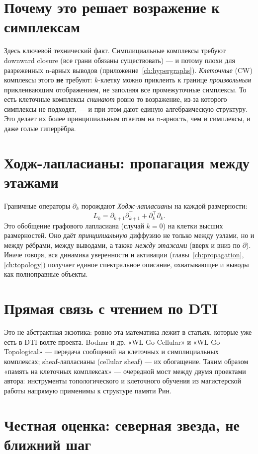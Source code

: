 \section{Почему это решает возражение к симплексам}

Здесь ключевой технический факт. Симплициальные комплексы требуют downward closure
(все грани обязаны существовать) — и потому плохи для разреженных n-арных выводов
(приложение~\ref{ch:hypergraphs}). \emph{Клеточные} (CW) комплексы этого
\textbf{не} требуют: $k$-клетку можно приклеить к границе \emph{произвольным}
приклеивающим отображением, не заполняя все промежуточные симплексы. То есть
клеточные комплексы \emph{снимают} ровно то возражение, из-за которого симплексы не
подходят, — и при этом дают единую алгебраическую структуру. Это делает их более
принципиальным ответом на n-арность, чем и симплексы, и даже голые гиперрёбра.

\section{Ходж-лапласианы: пропагация между этажами}

Граничные операторы $\partial_k$ порождают \emph{Ходж-лапласианы} на каждой
размерности:
\[
L_k=\partial_{k+1}\partial_{k+1}^\top+\partial_k^\top\partial_k .
\]
Это обобщение графового лапласиана (случай $k=0$) на клетки высших размерностей. Оно
даёт \emph{принципиальную} диффузию не только между узлами, но и между рёбрами,
между выводами, а также \emph{между этажами} (вверх и вниз по $\partial$). Иначе
говоря, вся динамика уверенности и активации (главы~\ref{ch:propagation},
\ref{ch:topology}) получает единое спектральное описание, охватывающее и выводы как
полноправные объекты.

\section{Прямая связь с чтением по DTI}

Это не абстрактная экзотика: ровно эта математика лежит в статьях, которые уже есть в
DTI-волте проекта. Bodnar и др. «WL Go Cellular» и «WL Go Topological» — передача
сообщений на клеточных и симплициальных комплексах; sheaf-лапласианы (cellular sheaf)
— их обогащение. Таким образом «память на клеточных комплексах» — очередной мост
между двумя проектами автора: инструменты топологического и клеточного обучения из
магистерской работы напрямую применимы к структуре памяти Рин.

\section{Честная оценка: северная звезда, не ближний шаг}

